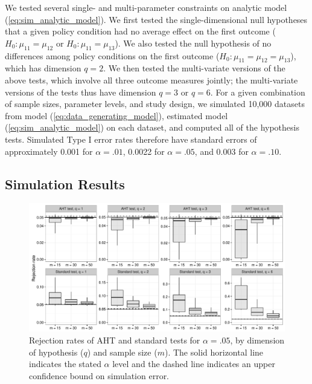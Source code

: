 \documentclass[12pt]{article}\usepackage[]{graphicx}\usepackage[]{color}
\newenvironment{knitrout}{}{} %
\begin{document}
We tested several single- and multi-parameter constraints on analytic model (\ref{eq:sim_analytic_model}). 
We first tested the single-dimensional null hypotheses that a given policy condition had no average effect on the first outcome ($H_0: \mu_{11} = \mu_{12}$ or $H_0: \mu_{11} = \mu_{13}$). 
We also tested the null hypothesis of no differences among policy conditions on the first outcome ($H_0: \mu_{11} = \mu_{12} = \mu_{13}$), which has dimension $q = 2$. 
We then tested the multi-variate versions of the above tests, which involve all three outcome measures jointly; the multi-variate versions of the tests thus have dimension $q = 3$ or $q = 6$. 
For a given combination of sample sizes, parameter levels, and study design, we simulated 10,000 datasets from model (\ref{eq:data_generating_model}), estimated model (\ref{eq:sim_analytic_model}) on each dataset, and computed all of the hypothesis tests. 
Simulated Type I error rates therefore have standard errors of approximately 0.001 for $\alpha = .01$, 0.0022 for $\alpha = .05$, and 0.003 for $\alpha = .10$. 

\subsection{Simulation Results}



\begin{knitrout}
\color{fgcolor}\begin{figure}

{\centering \includegraphics[width=\linewidth]{CR_fig/overview-1} 

}

\caption[Rejection rates of AHT and standard tests for ]{Rejection rates of AHT and standard tests for $\alpha = .05$, by dimension of hypothesis ($q$) and sample size ($m$). The solid horizontal line indicates the stated $\alpha$ level and the dashed line indicates an upper confidence bound on simulation error.}\label{fig:overview}
\end{figure}


\end{knitrout}
\end{document}
